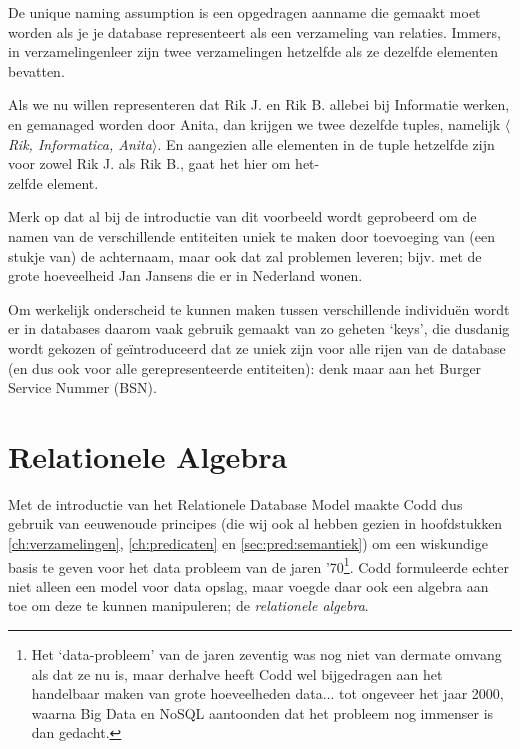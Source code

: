 \begin{aside}\mbox{}
De unique naming assumption is een opgedragen aanname die gemaakt moet worden als je je database representeert als een verzameling van relaties. Immers, in verzamelingenleer zijn twee verzamelingen hetzelfde als ze dezelfde elementen bevatten. 

Als we nu willen representeren dat Rik J. en Rik B. allebei bij Informatie werken, en gemanaged worden door Anita, dan krijgen we twee dezelfde tuples, namelijk \textit{$\langle$Rik, Informatica, Anita$\rangle$}. En aangezien alle elementen in de tuple hetzelfde zijn voor zowel Rik J. als Rik B., gaat het hier om het-\\[2.5pt]
zelfde element.

\hspace{20pt}Merk op dat al bij de introductie van dit voorbeeld wordt geprobeerd om de namen van de verschillende entiteiten uniek te maken door toevoeging van (een stukje van) de achternaam, maar ook dat zal problemen leveren; bijv. met de grote hoeveelheid Jan Jansens die er in Nederland wonen.

\hspace{20pt}Om werkelijk onderscheid te kunnen maken tussen verschillende individu\"en wordt er in databases daarom vaak gebruik gemaakt van zo geheten `keys', die dusdanig wordt gekozen of ge\"introduceerd dat ze uniek zijn voor alle rijen van de database (en dus ook voor alle gerepresenteerde entiteiten): denk maar aan het Burger Service Nummer (BSN).

\section{Relationele Algebra}
Met de introductie van het Relationele Database Model maakte Codd dus gebruik van eeuwenoude principes (die wij ook al hebben gezien in hoofdstukken \ref{ch:verzamelingen}, \ref{ch:predicaten} en \ref{sec:pred:semantiek}) om een wiskundige basis te geven voor het data probleem van de jaren '70\footnote{Het `data-probleem' van de jaren zeventig was nog niet van dermate omvang als dat ze nu is, maar derhalve heeft Codd wel bijgedragen aan het handelbaar maken van grote hoeveelheden data... tot ongeveer het jaar 2000, waarna Big Data en NoSQL aantoonden dat het probleem nog immenser is dan gedacht.}. Codd formuleerde echter niet alleen een model voor data opslag, maar voegde daar ook een algebra aan toe om deze te kunnen manipuleren; de \textit{relationele algebra}.


\end{aside}
